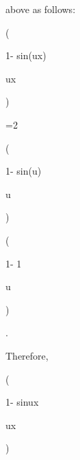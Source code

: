 above as follows:

(

1- sin(ux)

ux

)

=2

(

1- sin(u\vertx\vert)

u\vertx\vert

)


(

1- 1

u\vertx\vert

)

 .

Therefore,

(

1- sinux

ux

)

\geq

